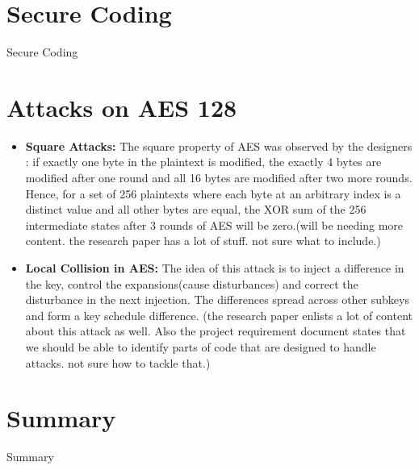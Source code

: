\documentclass[twoside]{article}
\begin{document}

\section{Secure Coding}
Secure Coding

\section{Attacks on AES 128}

\begin{itemize}
	\item \textbf{Square Attacks:}
	The square property of AES was observed by the designers : if exactly one byte in the plaintext is modified, the exactly 4 bytes are modified after one round and all 16 bytes are modified after two more rounds. Hence, for a set of 256 plaintexts where each byte at an arbitrary index is a distinct value and all other bytes are equal, the XOR sum of the 256 intermediate states after 3 rounds of AES will be zero.(will be needing more content. the research paper has a lot of stuff. not sure what to include.)
	
	\item \textbf{Local Collision in AES:}
	The idea of this attack is to inject a difference in the key, control the expansions(cause disturbances) and correct the disturbance in the next injection. The differences spread across other subkeys and form a key schedule difference.
	(the research paper enlists a lot of content about this attack as well. Also the project requirement document states that we should be able to identify parts of code that are designed to handle attacks. not sure how to tackle that.)
	
	
	

	
	
\end{itemize}

\section{Summary}
Summary

\end{document}
